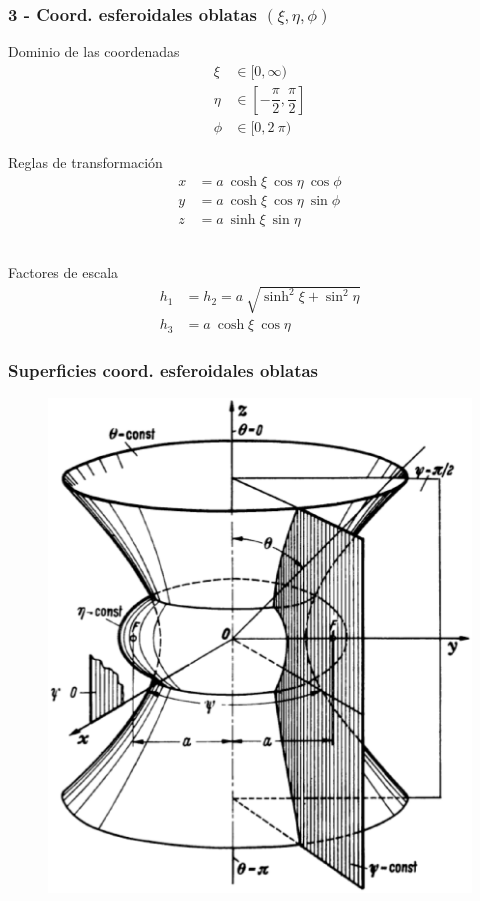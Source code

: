 \documentclass[12pt]{beamer}
\begin{document}
\begin{frame}
\frametitle{3 - Coord. esferoidales oblatas $(\xi, \eta, \phi)$}
\fontsize{12}{12}\selectfont
\begin{minipage}{0.45\textwidth}
Dominio de las coordenadas
\begin{align*}
\xi &\in [0, \infty) \\
\eta &\in \left[- \dfrac{\pi}{2}, \dfrac{\pi}{2} \right] \\
\phi &\in [0, 2\: \pi)
\end{align*}
\end{minipage}
\hspace{1cm}
\begin{minipage}{0.4\textwidth}
Reglas de transformación
\begin{align*}
x &= a \: \cosh \xi \: \cos \eta \: \cos \phi \\
y &= a \: \cosh \xi \: \cos \eta \: \sin \phi\\
z &= a \: \sinh \xi \: \sin \eta
\end{align*}
\end{minipage}
\\
\bigskip
Factores de escala
\begin{align*}
h_{1 }&= h_{2} = a \: \sqrt{\sinh^{2} \xi + \sin^{2} \eta} \\
h_{3 }&= a \: \cosh \xi \: \cos \eta
\end{align*}
\end{frame}
\begin{frame}
\frametitle{Superficies coord. esferoidales oblatas}
\begin{figure}[H]
  \centering
  \includegraphics[scale=0.3]{Imagenes/Sistema_Esfeoridal_Oblato.eps}
\end{figure}
\end{frame}  
\end{document}
